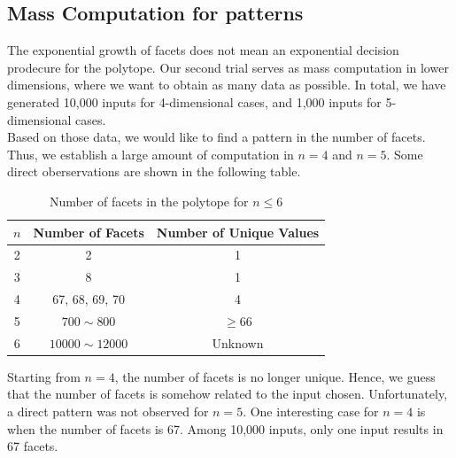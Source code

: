 \documentclass[12pt,letterpaper]{article}
\begin{document}
\subsection{Mass Computation for patterns}
The exponential growth of facets does not mean an exponential decision prodecure for the polytope. 
Our second trial serves as mass computation in lower dimensions, where we want to obtain 
as many data as possible. In total, we have generated 10,000 inputs for 4-dimensional cases, 
and 1,000 inputs for 5-dimensional cases. \\
Based on those data, we would like to find a pattern in 
the number of facets. Thus, we establish a large amount of 
computation in $n = 4$ and $n = 5$. Some direct oberservations are shown in the following table. 
\begin{table}[ht]
    \centering
    \begin{tabular}{||c | c | c ||}
        \hline 
        $n$ & Number of Facets & Number of Unique Values\\
        \hline 
        \hline 
 2 & 2 & 1\\
        \hline 
 3 & 8 & 1\\
        \hline 
 4 & 67, 68, 69, 70 & 4\\
        \hline 
 5 & $700 \sim 800$ & $\geq 66$\\
        \hline 
 6 & $10000 \sim 12000$  & Unknown\\
        \hline 
    \end{tabular}
    \caption{Number of facets in the polytope for $n \leq 6$}
\end{table}
Starting from $n = 4$, the number of facets is no longer unique. 
Hence, we guess that the number of facets is somehow related to the input chosen. 
Unfortunately, a direct pattern was not observed for $n=5$.
One interesting case for $n = 4$ is when the number of facets is 67.
Among 10,000 inputs, only one input results in 67 facets. 
\end{document}
